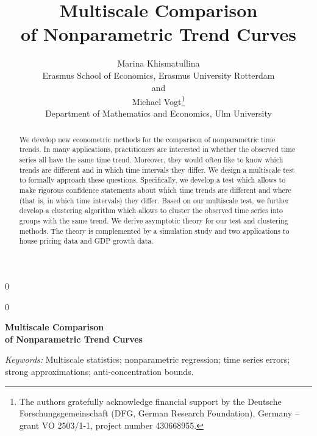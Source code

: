 \documentclass[12pt]{article}
\newcommand{\blind}{0}
\begin{document}
\def\spacingset#1{\renewcommand{\baselinestretch}%
{#1}\small\normalsize} \spacingset{1}

\blind
{
  \title{\bf Multiscale Comparison \\[0.1cm] of Nonparametric Trend Curves}
  \author{Marina Khismatullina\\ Erasmus School of Economics, Erasmus University Rotterdam\\
  and \\
  Michael Vogt\thanks{
  The authors gratefully acknowledge financial support by the Deutsche Forschungsgemeinschaft 
  (DFG, German Research Foundation), Germany – grant VO 2503/1-1, project number 430668955.}
  \hspace{.2cm}\\
  Department of Mathematics and Economics, Ulm University}
  \maketitle
} \fi

\blind
{
  \bigskip
  \bigskip
  \bigskip
  \begin{center}
    {\LARGE\bf Multiscale Comparison \\[0.3cm] of Nonparametric Trend Curves}
\end{center}
  \medskip
} \fi

\bigskip
\begin{abstract}
{\noindent We develop new econometric methods for the comparison of nonparametric time trends. In many applications, practitioners are interested in whether the observed time series all have the same time trend. Moreover, they would often like to know which trends are different and in which time intervals they differ. We design a multiscale test to formally approach these questions. Specifically, we develop a test which allows to make rigorous confidence statements about which time trends are different and where (that is, in which time intervals) they differ. Based on our multiscale test, we further develop a clustering algorithm which allows to cluster the observed time series into groups with the same trend. We derive asymptotic theory for our test and clustering methods. The theory is complemented by a simulation study and two applications to house pricing data and GDP growth data.}
\end{abstract}

\noindent%
{\it Keywords:} Multiscale statistics; nonparametric regression; time series errors; strong approximations; anti-concentration bounds.
\vfill
\end{document}

